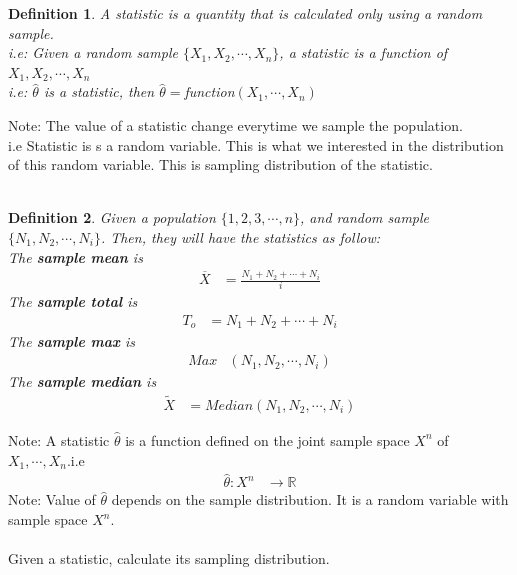 \documentclass[11pt,oneside]{book}
\theoremstyle{break}
\theoremstyle{break}
\newtheorem{defn}{Definition}[corL]
\newcommand{\note}{\color{Purple}Note: \color{black}}
\begin{document}
\begin{defn}
A statistic is a quantity that is calculated only using a random sample.\\
i.e: Given a random sample $\{X_1,X_2,\cdots,X_n\}$, a statistic is a function of $X_1,X_2,\cdots,X_n$\\
i.e: $\hat{\theta}$ is a statistic, then $\hat{\theta}=$function$(X_1,\cdots,X_n)$
\end{defn}
\note The value of a statistic change everytime we sample the population.\\
i.e Statistic is s a random variable. This is what we interested in the distribution of this random variable. This is sampling distribution of the statistic.\\
\hfill\\
\begin{defn}
Given a population $\{1,2,3,\cdots,n\}$, and random sample $\{N_1,N_2,\cdots,N_i\}$. Then, they will have the statistics as follow:\\
The \textbf{sample mean} is \begin{align*}
\overline{X}&=\frac{N_1+N_2+\cdots+N_i}{i}
\end{align*}
The \textbf{sample total} is \begin{align*}
T_o&=N_1+N_2+\cdots +N_i
\end{align*}
The \textbf{sample max} is \begin{align*}
Max&(N_1,N_2,\cdots, N_i)
\end{align*}
The \textbf{sample median} is \begin{align*}
\widetilde{X}&=Median(N_1,N_2,\cdots,N_i)
\end{align*}
\end{defn}
\note A statistic $\hat{\theta}$ is a function defined on the joint sample space $X^n$ of $X_1,\cdots,X_n$.i.e\begin{align*}
\hat{\theta}:X^n&\longrightarrow \mathbb{R}
\end{align*}
\note Value of $\hat{\theta}$ depends on the sample distribution. It  is a random variable with sample space $X^n$. \\
\hfill\\
Given a statistic, calculate its sampling distribution.\\
\end{document}
